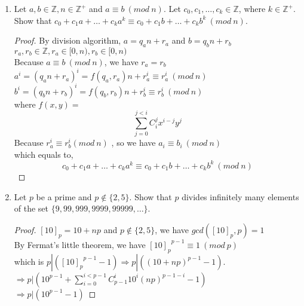 \documentclass{article}
\theoremstyle{break}
\begin{document}
\begin{enumerate}
\begin{proof}
    For the right side of the equation, $ \lfloor \frac{x}{n} \rfloor = \lfloor \frac{a + \epsilon}{n} \rfloor = \lfloor \frac{a}{n}  + \frac{\epsilon}{n}\rfloor = \lfloor p + \frac rn + \frac{\epsilon}{n} =  \lfloor p +\frac{r + \epsilon}{n} \rfloor $\\
    Because $ r \leq n-1, \epsilon < 1$, $r + \epsilon < n $ , so $\lfloor p +\frac{r + \epsilon}{n} \rfloor  = p $ \\
    Left side = Right side\\
\end{proof}
\newpage
\item Let $a,b \in \mathbb{Z}, n \in \mathbb{Z}^+$ and $a \equiv b \ (mod \ n) $. Let $c_0,c_1, \dots , c_k \in \mathbb{Z}$, where $k \in \mathbb{Z}^+$. Show that $c_0 + c_1a + \dots + c_k a^k \equiv  c_0 + c_1b + \dots + c_k b^k \  (mod \ n)$.
\begin{proof}
By division algorithm, $a = q_a n + r_a$ and $b = q_b  n+ r _b$  $r_a,r_b \in \mathbb{Z}, r_a \in [ 0, n ) ,r_b \in [ 0, n )$\\
Because $a \equiv b \ (mod \ n) $, we have $r_a = r_b$\\
$a^i =   ( q_a n + r_a )^i =  f(q_a, r_a)n + r_a^i  \equiv r_a^i \ (mod \ n)$\\
$b^i =   ( q_b n + r_b )^i =  f(q_b, r_b)n + r_b^i  \equiv r_b^i \ (mod \ n)$\\
where $f(x,y) = $ 
\[
    \sum_{j=0}^{j < i} C_i^j x^{i-j} y^j
\]
Because $ r_a^i \equiv r_b^i ( mod \ n) $ , so we have  $ a_i \equiv b_i\  (mod  \ n )$\\
which equals to,
\[c_0 + c_1a + \dots + c_k a^k \equiv  c_0 + c_1b + \dots + c_k b^k \  (mod \  n)\]
\end{proof}
\vspace{10mm}
\item Let $p$ be a prime and $p \notin \{2,5\} $. Show that  $p$ divides infinitely many elements of the set $  \{       9,99,999,9999,99999, \dots    \}$.
\begin{proof}
$ [10]_p = 10 + np$ and $p \notin \{2,5\} $, we have $gcd([10]_p,p)=1$\\
By Fermat's little theorem, we have ${ [10]_p} ^ {p-1}\equiv 1 \ (mod \ p) $\\
which is $p |({ [10]_p} ^ {p-1} -1 )\Rightarrow p | ((10 + np) ^{p-1} -1) $.\\
$\Rightarrow  p | (10^{p-1}+  \sum_{i=0}^{i<p-1}  C_{p-1}^{i}10^{i} (np)^{p-1-i} - 1)  $ \\
$ \Rightarrow p | (10^{p-1} -1)  $
\end{proof}
\end{enumerate}
\end{document}
